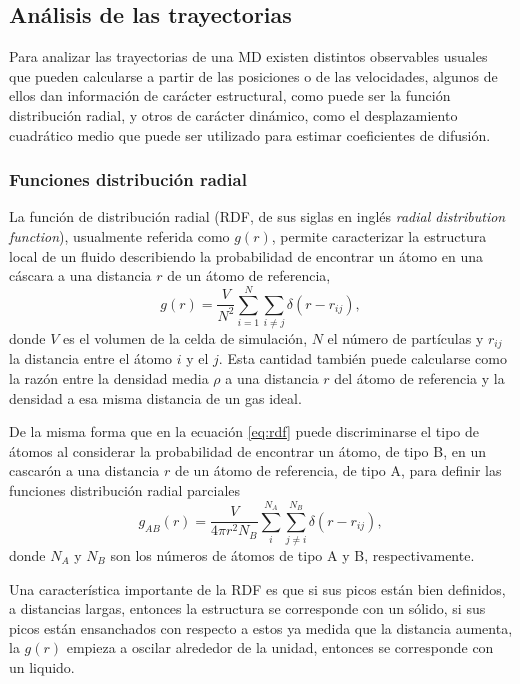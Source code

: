 \subsection{Análisis de las trayectorias}\label{s:observables}

Para analizar las trayectorias de una MD existen distintos observables usuales 
que pueden calcularse a partir de las posiciones o de las velocidades, algunos
de ellos dan información de carácter estructural, como puede ser la función 
distribución radial, y otros de carácter dinámico, como el desplazamiento 
cuadrático medio que puede ser utilizado para estimar coeficientes de difusión.

\subsubsection{Funciones distribución radial}

La función de distribución radial (RDF, de sus siglas en inglés \textit{radial 
distribution function}), usualmente referida como $g(r)$, permite caracterizar la
estructura local de un fluido describiendo la probabilidad de encontrar un átomo
en una cáscara a una distancia $r$ de un átomo de referencia,
\begin{equation}\label{eq:rdf}
    g(r) = \frac{V}{N^2} \sum_{i=1}^N \sum_{i \neq j} \delta(r - r_{ij}),
\end{equation}
donde $V$ es el volumen de la celda de simulación, $N$ el número de partículas y 
$r_{ij}$ la distancia entre el átomo $i$ y el $j$. Esta cantidad también puede 
calcularse como la razón entre la densidad media $\rho$ a una distancia $r$ del 
átomo de referencia y la densidad a esa misma distancia de un gas ideal.

De la misma forma que en la ecuación \ref{eq:rdf} puede discriminarse el tipo 
de átomos al considerar la probabilidad de encontrar un átomo, de tipo B, en un 
cascarón a una distancia $r$ de un átomo de referencia, de tipo A, para definir 
las funciones distribución radial parciales
\begin{equation}\label{eq:prdf}
    g_{AB}(r) = \frac{V}{4 \pi r^2 N_B} \sum_{i}^{N_A} \sum_{j\neq i}^{N_B} \delta(r - r_{ij}),
\end{equation}
donde $N_A$ y $N_B$ son los números de átomos de tipo A y B, respectivamente. 

Una característica importante de la RDF es que si sus picos están bien definidos,
a distancias largas, entonces la estructura se corresponde con un sólido, si sus 
picos están ensanchados con respecto a estos ya medida que la distancia aumenta, 
la $g(r)$ empieza a oscilar alrededor de la unidad, entonces se corresponde con 
un liquido.


